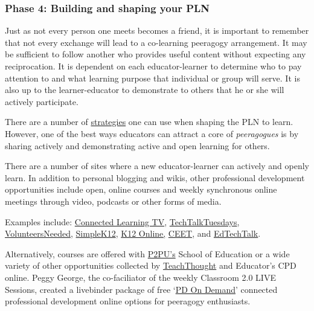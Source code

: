 \subsubsection{Phase 4: Building and shaping your
PLN}\label{phase-4-building-and-shaping-your-pln}

Just as not every person one meets becomes a friend, it is important to
remember that not every exchange will lead to a co-learning peeragogy
arrangement. It may be sufficient to follow another who provides useful
content without expecting any reciprocation. It is dependent on each
educator-learner to determine who to pay attention to and what learning
purpose that individual or group will serve. It is also up to the
learner-educator to demonstrate to others that he or she will actively
participate.

There are a number of
\href{http://storify.com/digiphile/how-to-build-a-personal-learning-network-on-twitte}{strategies}
one can use when shaping the PLN to learn. However, one of the best ways
educators can attract a core of \emph{peeragogues} is by sharing
actively and demonstrating active and open learning for others.

There are a number of sites where a new educator-learner can actively
and openly learn. In addition to personal blogging and wikis, other
professional development opportunities include open, online courses and
weekly synchronous online meetings through video, podcasts or other
forms of media.

Examples include:
\href{http://connectedlearning.tv/howard-rheingold-social-media-and-peer-learning-mediated-pedagogy-peeragogy}{Connected
Learning TV},
\href{http://techtalktuesdays.global2.vic.edu.au/}{TechTalkTuesdays},
\href{http://learning2gether.pbworks.com/w/page/32206114/volunteersneeded}{VolunteersNeeded},
\href{http://simplek12.com/webinars}{SimpleK12},
\href{http://k12onlineconference.org/}{K12 Online,}
\href{http://www.learnnowbc.ca/educators/moodlemeets/default.aspx}{CEET},
and \href{http://edtechtalk.com/taxonomy/term/130}{EdTechTalk}.

Alternatively, courses are offered with
\href{https://p2pu.org/en/schools/school-of-ed-pilot/}{P2PU's} School of
Education or a wide variety of other opportunities collected by
\href{http://www.teachthought.com/}{TeachThought} and Educator's CPD
online. Peggy George, the co-faciliator of the weekly Classroom 2.0 LIVE
Sessions, created a livebinder package of free
`\href{http://www.google.com/url?q=http\%3A\%2F\%2Fwww.livebinders.com\%2Fplay\%2Fplay_or_edit\%3Fid\%3D429095\&sa=D\&sntz=1\&usg=AFQjCNHCIdRn64rPwske2vP7xrpWolb-jA}{PD
On Demand}' connected professional development online options for
peeragogy enthusiasts.

